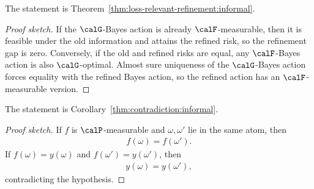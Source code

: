 \begin{theorem}
\label{thm:loss-relevant-refinement:sketch}
The statement is Theorem~\ref{thm:loss-relevant-refinement:informal}.
\end{theorem}
\begin{proof}[Proof sketch]
If the $\calG$-Bayes action is already $\calF$-measurable, then it is feasible under the old information and attains the refined risk, so the refinement gap is zero. Conversely, if the old and refined risks are equal, any $\calF$-Bayes action is also $\calG$-optimal. Almost sure uniqueness of the $\calG$-Bayes action forces equality with the refined Bayes action, so the refined action has an $\calF$-measurable version.
\end{proof}

\begin{theorem}
\label{thm:contradiction:sketch}
The statement is Corollary~\ref{thm:contradiction:informal}.
\end{theorem}
\begin{proof}[Proof sketch]
If $f$ is $\calP$-measurable and $\omega,\omega'$ lie in the same atom, then
\begin{align*}
f(\omega)=f(\omega').
\end{align*}
If $f(\omega)=y(\omega)$ and $f(\omega')=y(\omega')$, then
\begin{align*}
y(\omega)=y(\omega'),
\end{align*}
contradicting the hypothesis.
\end{proof}

